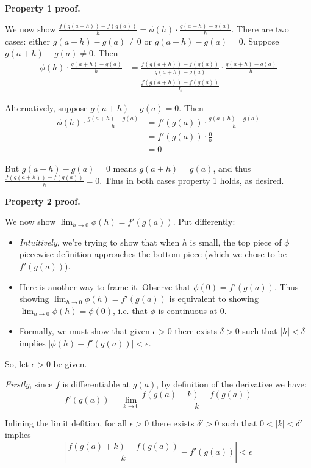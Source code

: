 \vs

\textbf{Property 1 proof.}

We now show
$\frac{f(g(a+h))-f(g(a))}{h}=\phi(h)\cdot\frac{g(a+h)-g(a)}{h}$. There are
two cases: either $g(a+h)-g(a)\neq0$ or $g(a+h)-g(a)=0$. Suppose
$g(a+h)-g(a)\neq0$. Then
\begin{align*}
  \phi(h)\cdot\frac{g(a+h)-g(a)}{h}&=\frac{f(g(a+h))-f(g(a))}{g(a+h)-g(a)}\cdot\frac{g(a+h)-g(a)}{h}\\
                            &=\frac{f(g(a+h))-f(g(a))}{h}
\end{align*}

Alternatively, suppose $g(a+h)-g(a)=0$. Then
\begin{align*}
  \phi(h)\cdot\frac{g(a+h)-g(a)}{h}&=f'(g(a))\cdot\frac{g(a+h)-g(a)}{h}\\
                            &=f'(g(a))\cdot\frac{0}{h}\\
                            &=0
\end{align*}

But $g(a+h)-g(a)=0$ means $g(a+h)=g(a)$, and thus
$\frac{f(g(a+h))-f(g(a))}{h}=0$. Thus in both cases property 1 holds,
as desired.

\vs

\textbf{Property 2 proof.}

We now show $\lim_{h\to0}\phi(h)=f'(g(a))$. Put differently:
\begin{itemize}
\item \textit{Intuitively}, we're trying to show that when $h$ is
  small, the top piece of $\phi$ piecewise definition approaches the
  bottom piece (which we chose to be $f'(g(a))$).
\item Here is another way to frame it. Observe that
  $\phi(0)=f'(g(a))$. Thus showing $\lim_{h\to0}\phi(h)=f'(g(a))$ is
  equivalent to showing $\lim_{h\to0}\phi(h)=\phi(0)$, i.e. that
  $\phi$ is continuous at $0$.
\item Formally, we must show that given $\epsilon>0$ there exists
  $\delta>0$ such that $|h|<\delta$ implies $|\phi(h)-f'(g(a))|<\epsilon$.
\end{itemize}

So, let $\epsilon>0$ be given.

\vs

\textit{Firstly}, since $f$ is differentiable at $g(a)$, by definition
of the derivative we have:
\[f'(g(a))=\lim_{k\to0}\frac{f(g(a)+k)-f(g(a))}{k}\]

Inlining the limit defition, for all $\epsilon>0$ there exists
$\delta'>0$ such that $0<|k|<\delta'$ implies
\[\left|\frac{f(g(a)+k)-f(g(a))}{k}-f'(g(a))\right|<\epsilon\]

